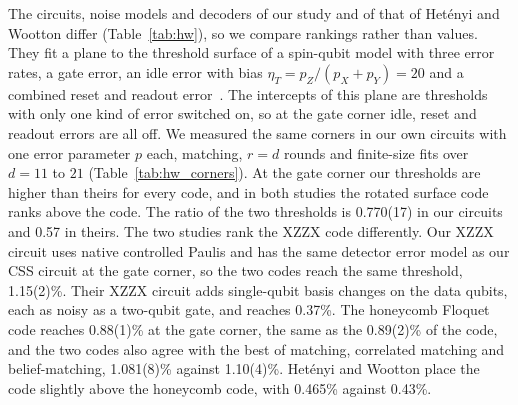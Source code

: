 
The circuits, noise models and decoders of our study and of that of Het\'enyi and Wootton differ (Table~\ref{tab:hw}), so we compare rankings rather than values. They fit a plane to the threshold surface of a spin-qubit model with three error rates, a gate error, an idle error with bias $\eta_T=p_Z/(p_X+p_Y)=20$ and a combined reset and readout error~\cite{hetenyi2024spin}. The intercepts of this plane are thresholds with only one kind of error switched on, so at the gate corner idle, reset and readout errors are all off. We measured the same corners in our own circuits with one error parameter $p$ each, matching, $r=d$ rounds and finite-size fits over $d=11$ to $21$ (Table~\ref{tab:hw_corners}). At the gate corner our thresholds are higher than theirs for every code, and in both studies the rotated surface code ranks above the \XYZ{} code. The ratio of the two thresholds is 0.770(17) in our circuits and 0.57 in theirs. The two studies rank the XZZX code differently. Our XZZX circuit uses native controlled Paulis and has the same detector error model as our CSS circuit at the gate corner, so the two codes reach the same threshold, 1.15(2)\%. Their XZZX circuit adds single-qubit basis changes on the data qubits, each as noisy as a two-qubit gate, and reaches 0.37\%. The honeycomb Floquet code reaches 0.88(1)\% at the gate corner, the same as the 0.89(2)\% of the \XYZ{} code, and the two codes also agree with the best of matching, correlated matching and belief-matching, 1.081(8)\% against 1.10(4)\%. Het\'enyi and Wootton place the \XYZ{} code slightly above the honeycomb code, with 0.465\% against 0.43\%.


